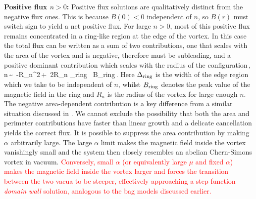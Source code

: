 \textbf{Positive flux $n>0$:} Positive flux solutions are qualitatively distinct from the negative flux ones.  This is because $B(0)<0$ independent of $n$, so 
$B(r)$ must switch sign to yield a net positive flux.  For large $n>0$, most of this positive flux remains concentrated in a ring-like region at the edge of the vortex. In this case the total flux can be written as a sum of two contributions, one that scales with the area of the vortex and is negative, therefore must be subleading, and a positive dominant contribution which scales with the radius of the configuration\,,
\pi n\,\sim\, -\pi R_n^2\,+\, 2\pi R_n \Delta_{\rm ring} \, B_{\rm ring}\,.\label{ringansatz}
\ee
Here $\Delta_{\rm ring}$ is the width of the  edge region which we take to be independent of $n$, whilst 
$B_{\rm ring}$
denotes the peak value of the magnetic field in the ring and $R_n$ 
is the radius of the vortex for large enough $n$. The negative area-dependent contribution  is a key difference from a similar situation discussed in \cite{Bolognesi:2007ez}.  We cannot exclude the possibility that both the area and perimeter 
contributions have faster than linear growth and a delicate cancellation yields the correct flux. It is possible to suppress the area contribution by making $\alpha$ arbitrarily large. The large $\alpha$ limit makes the magnetic field inside the vortex vanishingly small and the system then closely resembles an abelian Chern-Simons vortex in vacuum. \textcolor{red}{Conversely, small $\alpha$ (or equivalently large $\mu$ and fixed $\alpha$) makes the magnetic field inside the vortex larger and forces the transition between the two vacua to be steeper, effectively approaching a step function \textit{domain wall} solution, analogous to the bag models discussed earlier.}
